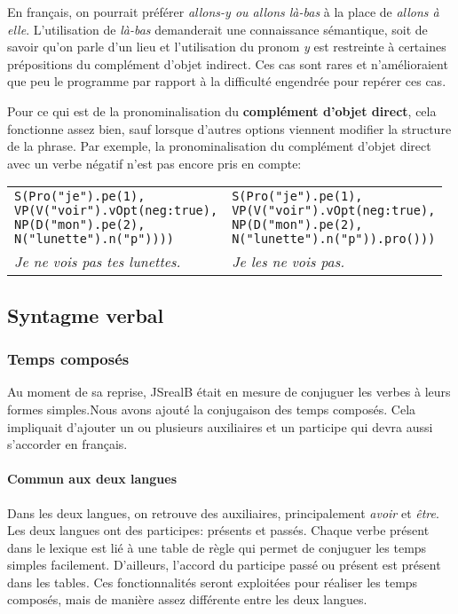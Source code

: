 \documentclass[11pt]{article} %
\newcommand{\real}[1]{\emph{#1}}
\begin{document}
En français, on pourrait préférer \emph{allons-y ou allons
là-bas} à la place de \emph{allons à elle}. L'utilisation de \emph{là-bas} demanderait une connaissance sémantique,
soit de savoir qu'on parle d'un lieu et l'utilisation du pronom \emph{y}
est restreinte à certaines prépositions du complément d'objet indirect.
Ces cas sont rares et n'amélioraient que peu le programme par rapport à la difficulté
engendrée pour repérer ces cas. 

Pour ce qui est de la pronominalisation du \textbf{complément d'objet
direct}, cela fonctionne assez bien, sauf lorsque d'autres options viennent
modifier la structure de la phrase. Par exemple, la pronominalisation du complément
d'objet direct avec un verbe négatif n'est pas encore pris en compte:\\
\begin{tabular}{p{8cm} p{8cm}}
\begin{alltt}
S(Pro("je").pe(1),
  VP(V("voir").vOpt({neg:true}),
     NP(D("mon").pe(2),
        N("lunette").n("p"))))
\end{alltt} &
\begin{alltt}
S(Pro("je").pe(1),
  VP(V("voir").vOpt({neg:true}),
     NP(D("mon").pe(2),
        N("lunette").n("p")).pro()))
\end{alltt} \\
\real{Je ne vois pas tes lunettes.} & \real{\color{red}Je les ne vois pas.}
\end{tabular}
\subsection{Syntagme verbal}

\subsubsection{Temps composés}

Au moment de sa reprise, JSrealB était en mesure de conjuguer les
verbes à leurs formes simples.Nous avons ajouté la conjugaison des temps composés.
Cela impliquait d'ajouter un ou plusieurs auxiliaires et un participe qui devra
aussi s'accorder en français.

\paragraph{Commun aux deux langues}

Dans les deux langues, on retrouve des auxiliaires, principalement 
\emph{avoir} et \emph{être}. Les deux langues ont des participes: 
présents et passés. Chaque verbe présent dans le lexique est 
lié à une table de règle qui 
permet de conjuguer les temps simples facilement. D'ailleurs, l'accord 
du participe passé ou présent est présent dans les tables. Ces fonctionnalités 
seront exploitées pour réaliser les temps composés, mais de manière assez 
différente entre les deux langues.
\end{document}
